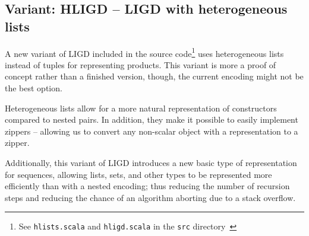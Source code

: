 \subsection{Variant: HLIGD -- LIGD with heterogeneous lists}
A new variant of LIGD included in the source code\footnote{See \texttt{hlists.scala} and \texttt{hligd.scala} in the \texttt{src} directory~\cite{src}}
uses heterogeneous lists instead of tuples for representing products.
This variant is more a proof of concept rather than a finished version, though,
the current encoding might not be the best option.

Heterogeneous lists allow for a more natural representation of constructors
compared to nested pairs. In addition, they make it possible to easily implement
zippers -- allowing us to convert any non-scalar object with a representation
to a zipper.

Additionally, this variant of LIGD introduces a new basic type of representation
for sequences, allowing lists, sets, and other types to be represented more
efficiently than with a nested encoding; thus reducing the number of recursion
steps and reducing the chance of an algorithm aborting due to a stack overflow.
